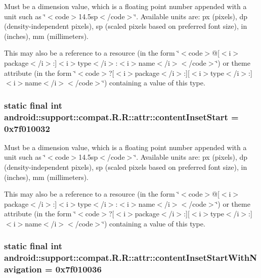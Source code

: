 Must be a dimension value, which is a floating point number appended with a unit such as \char`\"{}$<$code$>$14.5sp$<$/code$>$\char`\"{}. Available units are: px (pixels), dp (density-independent pixels), sp (scaled pixels based on preferred font size), in (inches), mm (millimeters). 

This may also be a reference to a resource (in the form \char`\"{}$<$code$>$@\mbox{[}$<$i$>$package$<$/i$>$:\mbox{]}$<$i$>$type$<$/i$>$:$<$i$>$name$<$/i$>$$<$/code$>$\char`\"{}) or theme attribute (in the form \char`\"{}$<$code$>$?\mbox{[}$<$i$>$package$<$/i$>$:\mbox{]}\mbox{[}$<$i$>$type$<$/i$>$:\mbox{]}$<$i$>$name$<$/i$>$$<$/code$>$\char`\"{}) containing a value of this type. \hypertarget{classandroid_1_1support_1_1compat_1_1_r_1_1attr_bf3b8bd9a95fee8d2219f246248ca34d}{
\subsubsection[{contentInsetStart}]{\setlength{\rightskip}{0pt plus 5cm}static final int android::support::compat.R.R::attr::contentInsetStart = 0x7f010032}}
\label{classandroid_1_1support_1_1compat_1_1_r_1_1attr_bf3b8bd9a95fee8d2219f246248ca34d}


Must be a dimension value, which is a floating point number appended with a unit such as \char`\"{}$<$code$>$14.5sp$<$/code$>$\char`\"{}. Available units are: px (pixels), dp (density-independent pixels), sp (scaled pixels based on preferred font size), in (inches), mm (millimeters). 

This may also be a reference to a resource (in the form \char`\"{}$<$code$>$@\mbox{[}$<$i$>$package$<$/i$>$:\mbox{]}$<$i$>$type$<$/i$>$:$<$i$>$name$<$/i$>$$<$/code$>$\char`\"{}) or theme attribute (in the form \char`\"{}$<$code$>$?\mbox{[}$<$i$>$package$<$/i$>$:\mbox{]}\mbox{[}$<$i$>$type$<$/i$>$:\mbox{]}$<$i$>$name$<$/i$>$$<$/code$>$\char`\"{}) containing a value of this type. \hypertarget{classandroid_1_1support_1_1compat_1_1_r_1_1attr_dbd8f88e76654cd67d35428b9af71115}{
\subsubsection[{contentInsetStartWithNavigation}]{\setlength{\rightskip}{0pt plus 5cm}static final int android::support::compat.R.R::attr::contentInsetStartWithNavigation = 0x7f010036}}
\label{classandroid_1_1support_1_1compat_1_1_r_1_1attr_dbd8f88e76654cd67d35428b9af71115}


